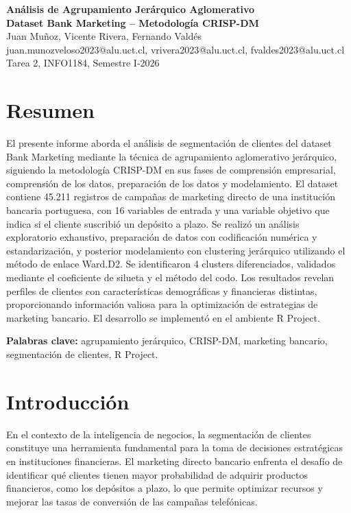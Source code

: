 \documentclass[10pt,a4paper]{article}
\begin{document}
\begin{center}
  {\LARGE \textbf{Análisis de Agrupamiento Jerárquico Aglomerativo}} \\[4pt]
  {\LARGE \textbf{Dataset Bank Marketing -- Metodología CRISP-DM}} \\[10pt]
  {\normalsize Juan Muñoz, Vicente Rivera, Fernando Valdés} \\[2pt]
  {\small juan.munozveloso2023@alu.uct.cl, vrivera2023@alu.uct.cl, fvaldes2023@alu.uct.cl} \\[2pt]
  {\small Tarea 2, INFO1184, Semestre I-2026}
\end{center}

\section*{Resumen}

El presente informe aborda el análisis de segmentación de clientes del dataset Bank Marketing mediante la técnica de agrupamiento aglomerativo jerárquico, siguiendo la metodología CRISP-DM en sus fases de comprensión empresarial, comprensión de los datos, preparación de los datos y modelamiento. El dataset contiene 45.211 registros de campañas de marketing directo de una institución bancaria portuguesa, con 16 variables de entrada y una variable objetivo que indica si el cliente suscribió un depósito a plazo. Se realizó un análisis exploratorio exhaustivo, preparación de datos con codificación numérica y estandarización, y posterior modelamiento con clustering jerárquico utilizando el método de enlace Ward.D2. Se identificaron 4 clusters diferenciados, validados mediante el coeficiente de silueta y el método del codo. Los resultados revelan perfiles de clientes con características demográficas y financieras distintas, proporcionando información valiosa para la optimización de estrategias de marketing bancario. El desarrollo se implementó en el ambiente R Project.

\textbf{Palabras clave:} agrupamiento jerárquico, CRISP-DM, marketing bancario, segmentación de clientes, R Project.

\section{Introducción}

En el contexto de la inteligencia de negocios, la segmentación de clientes constituye una herramienta fundamental para la toma de decisiones estratégicas en instituciones financieras. El marketing directo bancario enfrenta el desafío de identificar qué clientes tienen mayor probabilidad de adquirir productos financieros, como los depósitos a plazo, lo que permite optimizar recursos y mejorar las tasas de conversión de las campañas telefónicas.
\end{document}
